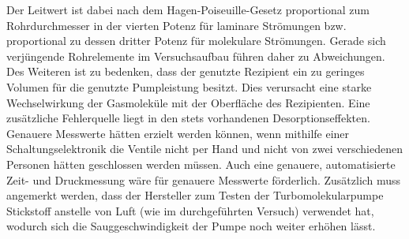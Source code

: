 Der Leitwert ist dabei nach dem Hagen-Poiseuille-Gesetz proportional zum Rohrdurchmesser in der vierten Potenz für laminare Strömungen bzw. proportional zu dessen dritter Potenz für molekulare Strömungen. Gerade sich verjüngende Rohrelemente im Versuchsaufbau führen daher zu Abweichungen. Des Weiteren ist zu bedenken, dass der genutzte Rezipient ein zu geringes Volumen für die genutzte Pumpleistung besitzt. Dies verursacht eine starke Wechselwirkung der Gasmoleküle mit der Oberfläche des Rezipienten. Eine zusätzliche Fehlerquelle liegt in den stets vorhandenen Desorptionseffekten. Genauere Messwerte hätten erzielt werden können, wenn mithilfe einer Schaltungselektronik die Ventile nicht per Hand und nicht von zwei verschiedenen Personen hätten geschlossen werden müssen. Auch eine genauere, automatisierte Zeit- und Druckmessung wäre für genauere Messwerte förderlich. Zusätzlich muss angemerkt werden, dass der Hersteller zum Testen der Turbomolekularpumpe Stickstoff anstelle von Luft (wie im durchgeführten Versuch) verwendet hat, wodurch sich die Sauggeschwindigkeit der Pumpe noch weiter erhöhen lässt. 